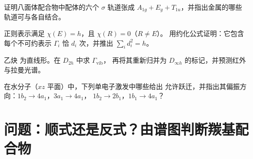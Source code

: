 \begin{exercise}[$\star\star$]\label{exo:b3:group-theory-applied:9}
证明八面体配合物中配体的六个 $\sigma$ 轨道张成
$A_{1g} + E_g + T_{1u}$，并指出金属的哪些轨道可与各自结合。
\end{exercise}

\begin{exercise}[$\star\star\star$]\label{exo:b3:group-theory-applied:10}
正则表示满足 $\chi(E) = h$，且 $\chi(R) = 0$（$R \ne E$）。
用约化公式证明：它包含每个不可约表示
$\Gamma_i$ 恰 $d_i$ 次，并推出 $\sum_id_i^2 = h$。
\end{exercise}

\begin{exercise}[$\star\star\star$]\label{exo:b3:group-theory-applied:11}
乙炔  为直线形。在 $D_{2h}$ 中求 $\Gamma_{\mathrm{vib}}$，
再将其重新归并为 $D_{\infty h}$ 的标记，并预测红外与拉曼光谱。
\end{exercise}

\begin{exercise}[$\star\star\star$]\label{exo:b3:group-theory-applied:12}
在水分子（$xz$ 平面）中，下列单电子激发中哪些给出
允许跃迁，并指出其偏振方向：$1b_2 \to 4a_1$，$3a_1 \to 4a_1$，
$1b_2 \to 2b_1$，$1b_1 \to 4a_1$？
\end{exercise}

\section{问题：顺式还是反式？由谱图判断羰基配合物}

